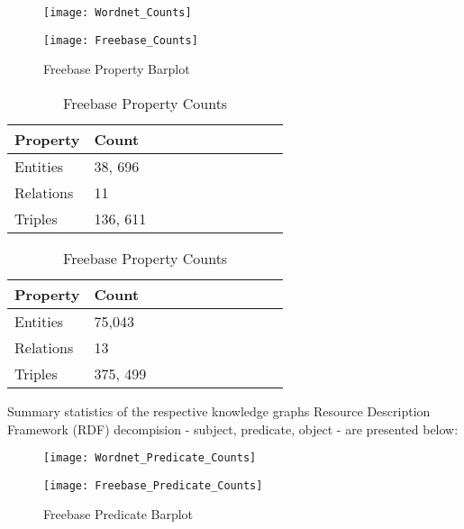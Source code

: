 \begin{figure}[H]
	\parbox{.5\linewidth}{
   		\caption{Wordnet Property Barplot}
   		\centering
    		\texttt{[image: Wordnet\_Counts]}
		}
	\hfill
	\parbox{.5\linewidth}{
		\caption{Freebase Property Barplot}
   		\centering
    		\texttt{[image: Freebase\_Counts]}
		}
\end{figure}


\begin{table}[H]
	\parbox{.5\linewidth}{
		\caption{Wordnet Property Counts}
		\centering
		\begin{tabular}{lllllllllll}
  			\textbf{Property} & \textbf{Count}  \\
  			\hline
  			Entities & 38, 696  \\
  			Relations & 11  \\
  			Triples & 136, 611  \\
		\end{tabular}
		}
	\hfill
	\parbox{.5\linewidth}{
		\caption{Freebase Property Counts}
		\centering
		\begin{tabular}{lllllllllll}
  			\textbf{Property} & \textbf{Count}  \\
  			\hline
  			Entities & 75,043   \\
  			Relations & 13  \\
  			Triples & 375, 499  \\
		\end{tabular}
		}
\end{table}


Summary statistics of the respective knowledge graphs Resource Description Framework (RDF) decompision - subject, predicate, object - are presented below:

\begin{figure}[H]
	\parbox{.5\linewidth}{
   		\caption{Wordnet Predicate Barplot}
   		\centering
    		\texttt{[image: Wordnet\_Predicate\_Counts]}
		}
	\hfill
	\parbox{.5\linewidth}{
		\caption{Freebase Predicate Barplot}
   		\centering
		\texttt{[image: Freebase\_Predicate\_Counts]}
		}
\end{figure}



